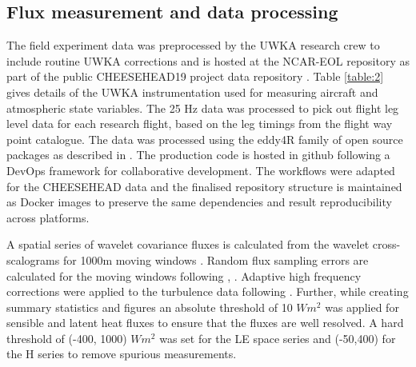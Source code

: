 \documentclass[draft]{agujournal2019}
\begin{document}
\subsection{Flux measurement and data processing}

The field experiment data was preprocessed by the UWKA research crew to include routine UWKA corrections and is hosted at the NCAR-EOL repository as part of the public CHEESEHEAD19 project data repository \cite{french_university_2021}. Table \ref{table:2} gives details of the UWKA instrumentation used for measuring aircraft and atmospheric state variables.  The 25 Hz data was processed to pick out flight leg level data for each research flight, based on the leg timings from the flight way point catalogue.  The data was  processed using the eddy4R  family of open source packages as described in . The production code is hosted in github following a DevOps framework for collaborative development. The workflows were adapted for the CHEESEHEAD data and the finalised repository structure is maintained as Docker images to preserve the same dependencies and result reproducibility across platforms.

A spatial series of wavelet covariance fluxes is calculated from the wavelet cross-scalograms for 1000m moving windows \cite{metzger_spatially_2013}. Random flux sampling errors are calculated for the moving windows following , . Adaptive high frequency corrections were applied to the turbulence data following \cite{nordbo_wavelet-based_2013}. Further, while creating summary statistics and figures an absolute threshold of 10 $W m^{2}$ was applied for sensible and latent heat fluxes to ensure that the fluxes are well resolved. A hard threshold of (-400, 1000) $W m^{2}$ was set for the LE space series and (-50,400) for the H series to remove spurious measurements. 
\end{document}
